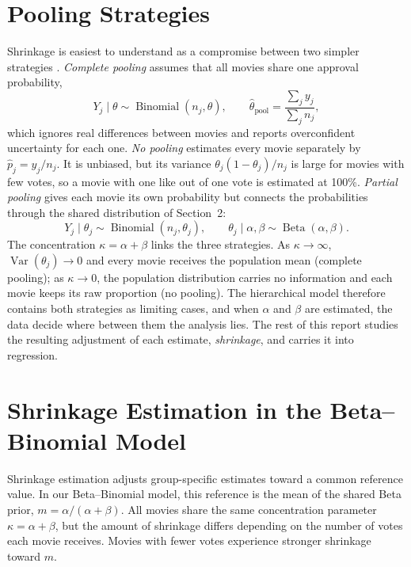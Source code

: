 \documentclass[11pt,a4paper]{article}
\newcommand{\Var}{\operatorname{Var}}
\newcommand{\BetaD}{\operatorname{Beta}}
\newcommand{\Bin}{\operatorname{Binomial}}
\begin{document}
\section{Pooling Strategies}
\label{sec:pooling}
Shrinkage is easiest to understand as a compromise between two simpler strategies \cite{gelmanhill2007}. \emph{Complete pooling} assumes that all movies share one approval probability,
\begin{equation}
Y_j\mid\theta\sim\Bin(n_j,\theta),\qquad
\widehat\theta_{\text{pool}}=\frac{\sum_j y_j}{\sum_j n_j},
\label{eq:complete-pooling}
\end{equation}
which ignores real differences between movies and reports overconfident uncertainty for each one. \emph{No pooling} estimates every movie separately by $\widehat p_j=y_j/n_j$. It is unbiased, but its variance $\theta_j(1-\theta_j)/n_j$ is large for movies with few votes, so a movie with one like out of one vote is estimated at 100\%. \emph{Partial pooling} gives each movie its own probability but connects the probabilities through the shared distribution of Section~2:
\begin{equation}
Y_j\mid\theta_j\sim\Bin(n_j,\theta_j),
\qquad
\theta_j\mid\alpha,\beta\sim\BetaD(\alpha,\beta).
\label{eq:partial-pooling}
\end{equation}
The concentration $\kappa=\alpha+\beta$ links the three strategies. As $\kappa\to\infty$, $\Var(\theta_j)\to0$ and every movie receives the population mean (complete pooling); as $\kappa\to0$, the population distribution carries no information and each movie keeps its raw proportion (no pooling). The hierarchical model therefore contains both strategies as limiting cases, and when $\alpha$ and $\beta$ are estimated, the data decide where between them the analysis lies. The rest of this report studies the resulting adjustment of each estimate, \emph{shrinkage}, and carries it into regression.

\section{Shrinkage Estimation in the Beta--Binomial Model}
\label{sec:shrinkage}

Shrinkage estimation adjusts group-specific estimates toward a common reference value. In our Beta--Binomial model, this reference is the mean of the shared Beta prior, $m=\alpha/(\alpha+\beta)$. All movies share the same concentration parameter $\kappa=\alpha+\beta$, but the amount of shrinkage differs depending on the number of votes each movie receives. Movies with fewer votes experience stronger shrinkage toward $m$.
\end{document}
